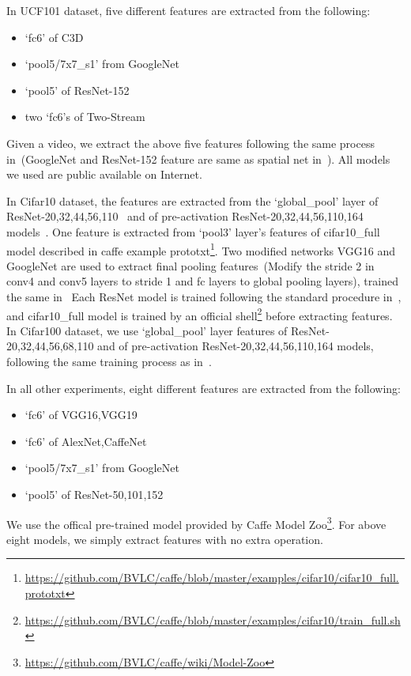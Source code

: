 \documentclass[letterpaper]{article}
\begin{document}
In UCF101 dataset, five different features are extracted from the following:
\begin{itemize}
  \item `fc6' of C3D~\cite{tran2015learning}
  \item `pool5/7x7\_s1' from GoogleNet~\cite{szegedy2015going}
  \item `pool5' of ResNet-152~\cite{he2015deep}
  \item two `fc6's of Two-Stream~\cite{simonyan2014two}
\end{itemize}
Given a video, we extract the above five features following the same process in~\cite{simonyan2014two,tran2015learning}(GoogleNet and ResNet-152 feature are same as spatial net in~\cite{simonyan2014two}). 
All models we used are public available on Internet. %

In Cifar10 dataset, the features are extracted from the `global\_pool' layer of ResNet-20,32,44,56,110~\cite{he2015deep} and of pre-activation ResNet-20,32,44,56,110,164 models~\cite{he2016identity}. 
One feature is extracted from `pool3' layer's features of cifar10\_full model described in caffe example prototxt\footnote{\url{https://github.com/BVLC/caffe/blob/master/examples/cifar10/cifar10_full.prototxt}}. 
Two modified networks VGG16 and GoogleNet are used to extract final pooling features~(Modify the stride 2 in conv4 and conv5 layers to stride 1 and fc layers to global pooling layers), trained the same in~\cite{he2015deep} 
Each ResNet model is trained following the standard procedure in~\cite{he2015deep,he2016identity}, and cifar10\_full model is trained by an official shell\footnote{\url{https://github.com/BVLC/caffe/blob/master/examples/cifar10/train_full.sh}} before extracting features. 
In Cifar100 dataset, we use `global\_pool' layer features of ResNet-20,32,44,56,68,110 and of pre-activation ResNet-20,32,44,56,110,164 models, following the same training process as in~\cite{he2015deep,he2016identity}.

In all other experiments, eight different features are extracted from the following:
\begin{itemize}
  \item `fc6' of VGG16,VGG19~\cite{chatfield2014return}
  \item `fc6' of AlexNet,CaffeNet~\cite{krizhevsky2012imagenet}
  \item `pool5/7x7\_s1' from GoogleNet~\cite{szegedy2015going}
  \item `pool5' of ResNet-50,101,152~\cite{he2015deep}
\end{itemize}
We use the offical pre-trained model provided by Caffe Model Zoo\footnote{\url{https://github.com/BVLC/caffe/wiki/Model-Zoo}}.
For above eight models, we simply extract features with no extra operation.
\end{document}
